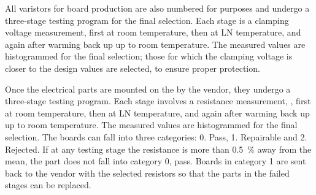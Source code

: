 All varistors for board production are also numbered for  purposes and undergo a three-stage  testing program for the final selection. Each stage is a clamping voltage measurement, first at room temperature, then at LN temperature, and again after warming back up up to room temperature.  
The measured values are histogrammed for the final selection; those for which the clamping voltage is closer to the design values are selected, to ensure proper protection.   

Once the electrical parts are mounted on the  by the vendor, they undergo a three-stage  testing program. Each stage involves a resistance measurement, , first at room temperature, then at LN temperature, and again after warming back up up to room temperature.  The measured values are histogrammed for the final selection.
The boards can fall into three categories: 0. Pass, 1. Repairable and 2. Rejected.  
If at any testing stage the resistance is more than \SI{0.5}{\%} away from the mean, the part does not fall into category 0, pass.  Boards in category 1 are sent back to the vendor with the selected resistors so that the parts in the failed stages can be replaced. 

